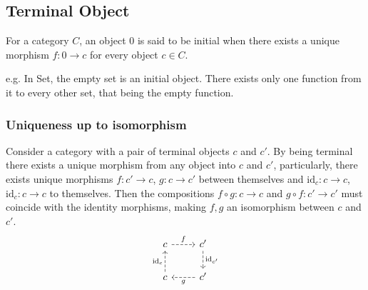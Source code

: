 \subsection{Terminal Object}

For a category $C$, an object $0$ is said to be initial when there exists a
unique morphism $f: 0\to c$ for every object $c\in C$.
\parencite{awodey:category_theory}

e.g. In Set, the empty set is an initial object. There exists only one function
from it to every other set, that being the empty function.

\subsubsection*{Uniqueness up to isomorphism}

Consider a category with a pair of terminal objects $c$ and $c'$. By being
terminal there exists a unique morphism from any object into $c$ and $c'$,
particularly, there exists unique morphisms $f: c' \to c$, $g: c \to c'$ between
themselves and $\mathrm{id}_c: c\to c$, $\mathrm{id}_c: c\to c$ to themselves.
Then the compositions $f\circ g:c\to c$ and $g\circ f:c' \to c'$ must coincide
with the identity morphisms, making $f,g$ an isomorphism between $c$ and $c'$.
\[\begin{tikzcd}
	c & {c'} \\
	c & {c'}
	\arrow["{\mathrm{id}_c}", dashed, from=2-1, to=1-1]
	\arrow["f", dashed, from=1-1, to=1-2]
	\arrow["{\mathrm{id}_{c'}}", dashed, from=1-2, to=2-2]
	\arrow["g", dashed, from=2-2, to=2-1]
\end{tikzcd}\]